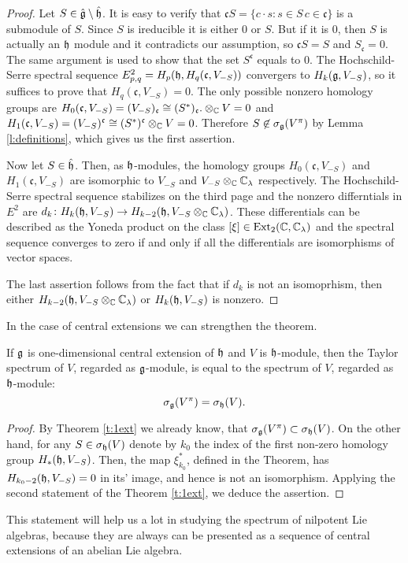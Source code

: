 \begin{proof}
    Let $S \in \hat{\mathfrak{g}} \setminus \hat{\mathfrak{h}}$. It is easy to verify that $\mathfrak{c}S=\{c\cdot s
    \colon s \in S\, c \in \mathfrak{c}\}$ is a submodule of $S$. Since $S$ is ireducible it is
    either $0$ or $S$. But if it is $0$, then $S$ is actually an $\mathfrak{h}$ module and it contradicts
    our assumption, so $\mathfrak{c}S = S$ and $S_\mathfrak{c} = 0$. The same argument is used
    to show that the set $S^\mathfrak{c}$ equals to $0$. The Hochschild-Serre spectral sequence
    $E^2_{p, q} = H_p(\mathfrak{h}, H_q(\mathfrak{c}, V_{-S}))$ convergers to $H_k(\mathfrak{g}, V_{-S})$, so it
    suffices to prove that $H_q(\mathfrak{c}, V_{- S})= 0$. The only possible nonzero homology
    groups are $H_0(\mathfrak{c}, V_{-S}) = (V_{-S})_\mathfrak{c} \cong (S^*)_\mathfrak{c}.
    \otimes_{\mathbb{C}} V = 0$ and $H_1(\mathfrak{c}, V_{-S}) = (V_{-S})^\mathfrak{c} \cong
    (S^*)^\mathfrak{c} \otimes_{\mathbb{C}} V = 0$. Therefore $S \not\in \sigma_{\mathfrak{g}}(V^\pi)$ by Lemma
    \ref{l:definitions}, which gives us the first assertion.

    Now let $S \in \hat{\mathfrak{h}}$. Then, as $\mathfrak{h}$-modules, the homology groups $H_0(\mathfrak{c},
    V_{-S})$ and $H_1(\mathfrak{c}, V_{-S})$ are isomorphic to $V_{-S}$ and $V_{-S}\otimes_{\mathbb{C}}
    \mathbb{C}_\lambda$ respectively. The Hochschild-Serre spectral sequence stabilizes on the third page
    and the nonzero differntials in $E^2$ are $d_k\colon H_k(\mathfrak{h}, V_{-S}) \to H_{k - 2}(\mathfrak{h},
    V_{-S}\otimes_{\mathbb{C}} \mathbb{C}_\lambda)$. These differentials can be described as the Yoneda product on
    the class $[\xi] \in \operatorname{Ext}_2(\mathbb{C}, \mathbb{C}_\lambda)$ and the spectral sequence converges to zero if
    and only if all the differentials are isomorphisms of vector spaces.

    The last assertion follows from the fact that if $d_k$ is not an isomoprhism, then either
    $H_{k - 2}(\mathfrak{h},  V_{-S}\otimes_{\mathbb{C}} \mathbb{C}_\lambda)$ or $H_k(\mathfrak{h}, V_{-S})$ is nonzero.
\end{proof}
In the case of central extensions we can strengthen the theorem.
\begin{corollary}
    If $\mathfrak{g}$ is one-dimensional central extension of $\mathfrak{h}$ and $V$ is $\mathfrak{h}$-module, then
    the Taylor spectrum of $V$, regarded as $\mathfrak{g}$-module, is equal to the spectrum of $V$,
    regarded as $\mathfrak{h}$-module:
    \[
        \sigma_{\mathfrak{g}}(V^\pi) = \sigma_{\mathfrak{h}}(V).
    \]

\end{corollary}
\begin{proof}
    By Theorem \ref{t:1ext} we already know, that $\sigma_{\mathfrak{g}}(V^\pi) \subset \sigma_{\mathfrak{h}}(V)$. On
    the other hand, for any $S\in \sigma_{\mathfrak{h}}(V)$ denote by $k_0$ the index of the first non-zero
    homology group $H_*(\mathfrak{h}, V_{-S})$. Then, the map $\xi^*_{k_0}$, defined in the Theorem, has
    $H_{k_0 - 2}(\mathfrak{h}, V_{-S}) = 0$ in its' image, and hence is not an isomorphism. Applying the
    second statement of the Theorem \ref{t:1ext}, we deduce the assertion.
\end{proof}
This statement will help us a lot in studying the spectrum of nilpotent Lie algebras, because they are
always can be presented as a sequence of central extensions of an abelian Lie algebra.
